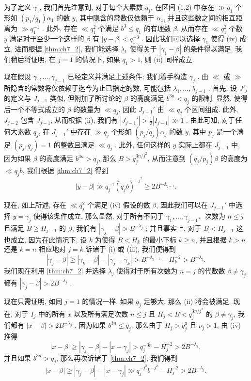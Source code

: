 为了定义 $\gamma_1$, 我们首先注意到, 对于每个大素数 $q_1$, 在区间 (1,2) 中存在 $\gg q_1$ 个形如 $(p_1/q_1)\alpha_1$ 的数 $y$, 其中隐含的常数仅依赖于 $\alpha_1$, 并且这些数之间的相互距离为 $\gg q_1^{-1}$ . 此外, 存在 $\ll q_1^2$ 个满足 $b^3 \le q_1$ 的有理数 $\beta$, 从而存在 $\ll q_1^2$ 个数 $y$ 满足对于至少一个这样的 $\beta$ 有 $|y-\beta| < q_1^{-3}$ . 因此我们可以选择 $\gamma_1$ 使得 (iv) 成立, 进而根据 \autoref{thm:ch7_2}, 我们能选择 $\lambda_1$ 使得关于 $|\gamma_1-\beta|$ 的条件得以满足. 我们稍后将证明, 在 $j=1$ 的情况下, 如果 $q_1 > 1$, 则 (ii) 同样成立.

现在假设 $\gamma_1, \dots, \gamma_{j-1}$ 已经定义并满足上述条件; 我们着手构造 $\gamma_j$ . 由 $\ll$ 或 $\gg$ 所隐含的常数将仅依赖于迄今为止已指定的数, 可能包括 $\lambda_1, \dots, \lambda_{j-1}$ . 首先, 设 $J'_j$ 的定义与 $J_{j-1}$ 类似, 但附加了所讨论的 $\beta$ 的高度满足 $b^{3n} < q_j$ 的限制. 显然, 使得后一个不等式成立的 $\beta$ 的数量为 $\ll q_j$, 因此 $J_{j-1}'$ 由 $\ll q_j$ 个区间组成. 此外, $J_{j-2}$ 包含 $J_{j-1}$, 从而根据 (ii), 我们有 $|J_{j-1}'| > \frac{1}{2}|I_{j-1}| \gg 1$ . 由此可知, 对于任何大素数 $q_j$, 在 $J_{j-1}'$ 中存在 $\gg q_j$ 个形如 $(p_j/q_j)\alpha_j$ 的数 $y$, 其中 $p_j$ 是一个满足 $(p_j, q_j) = 1$ 的整数且满足 $\ll q_j$ . 此外, 任何这样的 $y$ 实际上都在 $J_{j-1}$ 中, 因为如果 $\beta$ 的高度满足 $b^{3n} > q_j$, 那么 $B > q_j^{3n/j^2}$, 从而注意到 $(q_j/p_j)\beta$ 的高度为 $\ll q_j b$, 我们根据 \autoref{thm:ch7_2} 得到
\[|y-\beta| \gg q_j^{-1}(q_j b)^{-j^2} \ge 2B^{-\lambda_{j-1}}.\]

现在, 如上所述, 存在 $\ll q_j^2$ 个满足 (iv) 假设的数 $\beta$, 因此我们可以在 $J_{j-1}'$ 中选择 $y = \gamma_j$ 使得该条件成立. 那么显然, 对于所有不同于 $\gamma_1, \dots, \gamma_{j-1}$、次数为 $n \le j$ 且满足 $B \ge H_{j-1}$ 的 $\beta$, 我们有 $|\gamma_j-\beta| > B^{-\lambda_j}$ ; 并且事实上, 对于 $B < H_{j-1}$ 这也成立, 因为在此情况下, 设 $k$ 为使得 $B < H_k$ 的最小下标 $k \ge n$, 并且根据 $k > n$ 还是 $k = n$ 相应地对 $j=k$ 诉诸于 (i) 或 (iii), 我们便得到
\[| \gamma_j-\beta | \ge |\gamma_k-\beta| - |\gamma_j-\gamma_k| > B^{-\lambda_{j-1}} - H_k^{-2} > B^{-\lambda_j}.\]
我们现在利用 \autoref{thm:ch7_2} 并选择 $\lambda_j$ 使得对于所有次数为 $n = j$ 的代数数 $\beta \neq \gamma_j$ 都有 $|\gamma_j-\beta| > 2B^{-\lambda_j}$ .

现在只需证明, 如同 $j=1$ 的情况一样, 如果 $q_j$ 足够大, 那么 (ii) 将会被满足. 现在, 对于 $I_j$ 中的所有 $x$ 以及所有满足次数 $n \le j$ 且 $H_j < B < q_j^{3n/j^2}$ 的 $\beta \neq \gamma_j$, 我们都有 $|x-\beta| > 2B^{-\lambda_j}$ . 因为如果 $b^{3n} \le q_j$, 那么由于 $H_j > q_j^3$ 且 $\nu_j > 1$, 由 (iv) 推得
\[|x-\beta| \ge |\gamma_j-\beta| - |x-\gamma_j| > q_j^{-3n} - H_j^{-2} > 2B^{-\lambda_j},\]
并且如果 $b^{3n} > q_j$, 那么再次诉诸于 \autoref{thm:ch7_2}, 我们得到
\[|x-\beta| \ge |\gamma_j-\beta| - |x-\gamma_j| \gg q_j^{-j^2}b^{-j^2} - H_j^{-2} > 2B^{-\lambda_j}.\]

